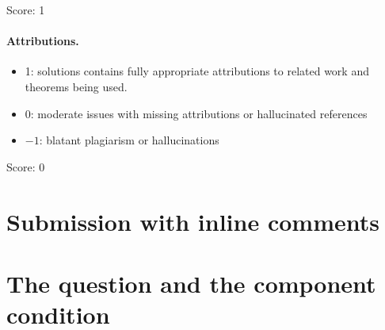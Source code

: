 \documentclass[11pt]{article}
\theoremstyle{definition}
\theoremstyle{remark}
\newcommand{\Q}{\mathbb Q}
\begin{document}
\noindent Score: 1

\paragraph{Attributions.}
\begin{itemize}
	\item  1: solutions contains fully appropriate attributions
		to related work and theorems being used.
	\item  0: moderate issues with missing attributions or hallucinated references
	\item  $-1$: blatant plagiarism or hallucinations
\end{itemize}

\noindent Score: 0

\newpage
\section{Submission with inline comments}


\begin{abstract}
We examine the proposed correspondence between $H$-polarised Tyurin degenerations of K3 surfaces and elliptic fibrations on $H\oplus E_8\oplus E_8$-quasipolarised K3 surfaces, using the sign conventions in the cited definitions of Giovenzana--Thompson. For an elliptic fibration $W$ over a disc with boundary fibre $F$, we prove that their required component isometry forces $K_V^2=-\dim_{\Q}H_1(W,F;\Q)$. Thus a positive-degree rational component is impossible. We construct an $H$-polarised Tyurin degeneration with component degrees $1$ and $-1$, an effective flat nef Cartier divisor of positive square on both components, and boundary point outside all closures of proper interior Noether--Lefschetz loci. This gives a counterexample to the stated existence assertion. The obstruction depends on the simultaneous choices of fibre intersection, clockwise displacement in the Seifert pairing, and anticlockwise monodromy; it makes no assertion about a correspondence with modified conventions.
\end{abstract}


\section{The question and the component condition}
\end{document}
